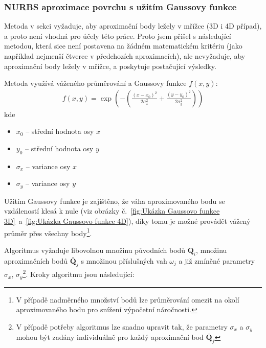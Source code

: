 \subsubsection{NURBS aproximace povrchu s užitím Gaussovy funkce}\label{section: gauss surface approximation 3D}
Metoda v sekci  vyžaduje, aby aproximační
body ležely v mřížce (3D i 4D případ), a proto není vhodná pro účely této
práce. Proto jsem přišel s následující metodou, která sice není postavena na
žádném matematickém kritériu (jako například nejmenší čtverce v předchozích
aproximacích), ale nevyžaduje, aby aproximační body ležely v mřížce, a poskytuje
postačující výsledky. \par Metoda využívá váženého průměrování a Gaussovy
funkce $f(x, y)$:
\begin{align}
    f(x,y) = \exp\left(-\left(\frac{(x - x_0)^2}{2\sigma_x^2} + \frac{(y - y_0)^2}{2\sigma_y^2}\right)\right)
\end{align}
kde
\begin{itemize}
    \item $x_0$ -- střední hodnota osy $x$
    \item $y_0$ -- střední hodnota osy $y$
    \item $\sigma_x$ -- variance osy $x$
    \item $\sigma_y$ -- variance osy $y$
\end{itemize}
Užitím Gaussovy funkce je zajištěno, že váha aproximovaného bodu se vzdáleností klesá k nule
(viz obrázky č.~\ref{fig:Ukázka Gaussovo funkce 3D}~a~\ref{fig:Ukázka Gaussovo funkce 4D}),
díky tomu je možné provádět vážený průměr přes všechny body\footnote{V případě nadměrného množství bodů lze průměrování omezit na okolí aproximovaného bodu pro snížení výpočetní náročnosti.}.\par
Algoritmus vyžaduje libovolnou množinu původních bodů $\bm{Q}_i$, množinu
aproximačních bodů $\bar{\bm{Q}}_j$ s množinou příslušných vah $\omega_j$ a již
zmíněné parametry $\sigma_x$, $\sigma_y$\footnote{V případě potřeby algoritmus lze snadno
    upravit tak, že parametry $\sigma_x$ a $\sigma_y$ mohou být zadány individuálně
    pro každý aproximační bod $\bar{\bm{Q}}_j$}. Kroky algoritmu jsou následující:
